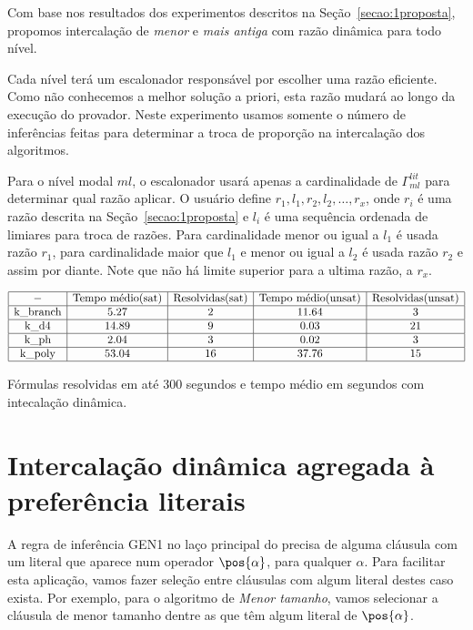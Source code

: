 Com base nos resultados dos experimentos descritos na Seção~\ref{secao:1proposta}, propomos intercalação de \textit{menor} e \textit{mais antiga} com razão dinâmica para todo nível.

Cada nível terá um escalonador responsável por escolher uma razão eficiente. Como não conhecemos a melhor solução a priori, esta razão mudará ao longo da execução do provador. Neste experimento usamos somente o número de inferências feitas para determinar a troca de proporção na intercalação dos algoritmos.

Para o nível modal $ml$, o escalonador usará apenas a cardinalidade de $\Gamma^{lit}_{ml}$ para determinar qual razão aplicar. O usuário define $r_1, l_1, r_2, l_2, \ldots, r_x$, onde $r_i$ é uma razão descrita na Seção~\ref{secao:1proposta} e $l_i$ é uma sequência ordenada de limiares para troca de razões. Para cardinalidade menor ou igual a $l_1$ é usada razão $r_1$, para cardinalidade maior que $l_1$ e menor ou igual a $l_2$ é usada razão $r_2$ e assim por diante. Note que não há limite superior para a ultima razão, a $r_x$.

\begin{table*}[t]
	\[
\begin{array}{|c|c|c|c|c|}
	\hline - & \textnormal{Tempo médio(sat)} & \textnormal{Resolvidas(sat)} & \textnormal{Tempo médio(unsat)} & \textnormal{Resolvidas(unsat)} \\
	
	\hline \textnormal{k\_branch} & 5.27 & 2 & 11.64 & 3 \\
	\hline \textnormal{k\_d4} & 14.89 & 9 & 0.03 & 21 \\
	\hline \textnormal{k\_ph} & 2.04 & 3 & 0.02 & 3 \\
	\hline \textnormal{k\_poly} & 53.04 & 16 & 37.76 & 15 \\
	
	\hline
	
\end{array}
	\]
\caption{Fórmulas resolvidas em até 300 segundos e tempo médio em segundos com intecalação dinâmica.}
\label{table:300threshold1}
\end{table*}

\section{Intercalação dinâmica agregada à preferência literais}
A regra de inferência GEN1 no laço principal do \ksp precisa de alguma cláusula com um literal que aparece num operador $\pos{\alpha}$, para qualquer $\alpha$. Para facilitar esta aplicação, vamos fazer seleção entre cláusulas com algum literal destes caso exista. Por exemplo, para o algoritmo de \textit{Menor tamanho}, vamos selecionar a cláusula de menor tamanho dentre as que têm algum literal de $\pos{\alpha}$.


